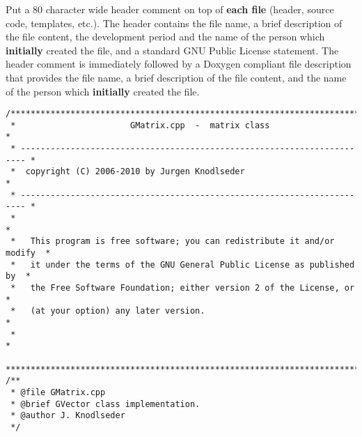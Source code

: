 \documentclass{article}[12pt,a4]
\begin{document}
Put a 80 character wide header comment on top of {\bf each file}
(header, source code, templates, etc.).
The header contains
the file name,
a brief description of the file content,
the development period and the name of the person which {\bf initially}
created the file, and
a standard GNU Public License statement.
The header comment is immediately followed by a Doxygen compliant
file description that provides
the file name,
a brief description of the file content, and
the name of the person which {\bf initially} created the file.
\begin{verbatim}
/***************************************************************************
 *                       GMatrix.cpp  -  matrix class                      *
 * ----------------------------------------------------------------------- *
 *  copyright (C) 2006-2010 by Jurgen Knodlseder                           *
 * ----------------------------------------------------------------------- *
 *                                                                         *
 *   This program is free software; you can redistribute it and/or modify  *
 *   it under the terms of the GNU General Public License as published by  *
 *   the Free Software Foundation; either version 2 of the License, or     *
 *   (at your option) any later version.                                   *
 *                                                                         *
 ***************************************************************************/
/**
 * @file GMatrix.cpp
 * @brief GVector class implementation.
 * @author J. Knodlseder
 */
\end{verbatim}
\end{document}

